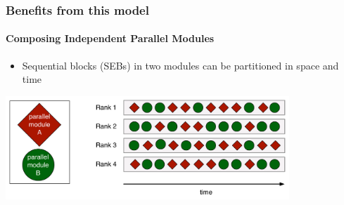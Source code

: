 \begin{frame}[fragile]
\frametitle{Benefits from this model}
\framesubtitle{Composing Independent Parallel Modules}
  \begin{itemize}
    \item Sequential blocks (SEBs) in two modules can be partitioned in space
      and time
  \end{itemize}
  \begin{center}
    \includegraphics[width=0.8\textwidth]{figures/composition.pdf}
  \end{center}
\end{frame}
